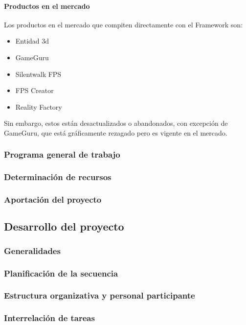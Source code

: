 \documentclass[]{article}
\begin{document}
\paragraph{Productos en el mercado}
Los productos en el mercado que compiten directamente con el Framework son: 
\begin{itemize}
	\item Entidad 3d
	\item GameGuru
	\item Silentwalk FPS 
	\item FPS Creator
	\item Reality Factory
	
\end{itemize}
Sin embargo, estos est\'an desactualizados o abandonados, con excepci\'on de GameGuru, que est\'a gr\'aficamente rezagado pero es vigente en el mercado. 

\subsubsection{Programa general de trabajo}

\subsubsection{Determinaci\'on de recursos}
\subsubsection{Aportaci\'on del proyecto}

\subsection{Desarrollo del proyecto}
\subsubsection{Generalidades}
\subsubsection{Planificaci\'on de la secuencia}
\subsubsection{Estructura organizativa y personal participante}
\subsubsection{Interrelaci\'on de tareas}
\end{document}
